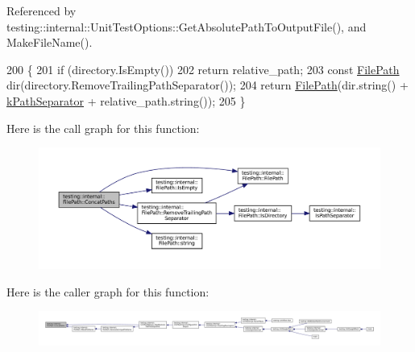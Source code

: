 Referenced by testing\+::internal\+::\+Unit\+Test\+Options\+::\+Get\+Absolute\+Path\+To\+Output\+File(), and Make\+File\+Name().


\begin{DoxyCode}
200                                                               \{
201   \textcolor{keywordflow}{if} (directory.IsEmpty())
202     \textcolor{keywordflow}{return} relative\_path;
203   \textcolor{keyword}{const} \hyperlink{classtesting_1_1internal_1_1FilePath_a3504a51accbca78a52fe586133ea5499}{FilePath} dir(directory.RemoveTrailingPathSeparator());
204   \textcolor{keywordflow}{return} \hyperlink{classtesting_1_1internal_1_1FilePath_a3504a51accbca78a52fe586133ea5499}{FilePath}(dir.string() + \hyperlink{namespacetesting_1_1internal_afcd71adaa9d1e6df7b282a17fc48125c}{kPathSeparator} + relative\_path.string());
205 \}
\end{DoxyCode}
Here is the call graph for this function\+:
\nopagebreak
\begin{figure}[H]
\begin{center}
\leavevmode
\includegraphics[width=350pt]{classtesting_1_1internal_1_1FilePath_ac9d57987f60ac43f0c57b89e333e531e_cgraph}
\end{center}
\end{figure}
Here is the caller graph for this function\+:
\nopagebreak
\begin{figure}[H]
\begin{center}
\leavevmode
\includegraphics[width=350pt]{classtesting_1_1internal_1_1FilePath_ac9d57987f60ac43f0c57b89e333e531e_icgraph}
\end{center}
\end{figure}
\mbox{\label{classtesting_1_1internal_1_1FilePath_a26790e530dd738f7fc8202c1ce718406}} 
